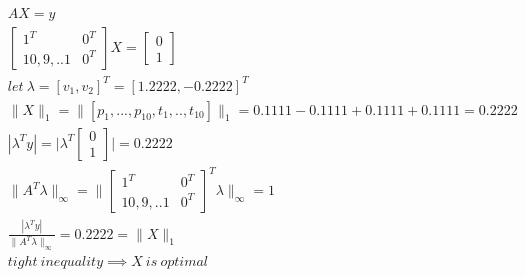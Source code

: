 \documentclass[12pt,letter]{article}
\newcommand{\norm}[1]{\|#1\|}
\begin{document}
\begin{enumerate}
\begin{enumerate}
\begin{enumerate}
      \begin{align*}
        &AX=y\\
        &\begin{bmatrix}
          1^T & 0^T\\
          10,9,..1 & 0^T
        \end{bmatrix} X
                     =
                     \begin{bmatrix}
                       0 \\ 1
                     \end{bmatrix}\\
        &let\ \lambda = [v_1, v_2]^T=[1.2222,-0.2222]^T\\
        &\norm{X}_1 = \norm{[p_1,...,p_{10},t_1,..,t_{10}]}_1 = 0.1111-0.1111+0.1111+0.1111=0.2222\\
        &|\lambda^T y| = \bigg|\lambda^T
          \begin{bmatrix}
            0\\1
          \end{bmatrix}\bigg| = 0.2222\\
        &\|A^T \lambda\|_{\infty} = \bigg\|\begin{bmatrix}
          1^T & 0^T\\
          10,9,..1 & 0^T
        \end{bmatrix}^T \lambda\bigg\|_{\infty} = 1\\
        &\frac{|\lambda^T y|}{\norm{A^T\lambda}_{\infty}} = 0.2222 = \norm{X}_1\\
        &tight\ inequality \implies X\ is\ optimal
      \end{align*}
      

\end{enumerate}
\end{enumerate}
\end{enumerate}
\end{document}
